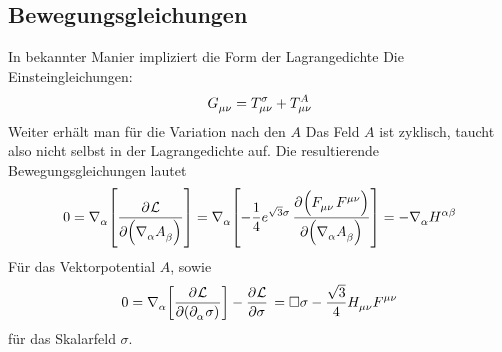 \subsection{Bewegungsgleichungen}
In bekannter Manier impliziert die Form der Lagrangedichte 
Die Einsteingleichungen:
\begin{equation}
\tensor{G}{_\mu_\nu}=\tensor*{T}{*^{\sigma}_\mu_\nu}+\tensor*{T}{*^{A}*_\mu*_\nu}
\end{equation}
Weiter erhält man für die Variation nach den $A$ 
Das Feld $A$ ist zyklisch, taucht also nicht selbst in der Lagrangedichte auf.
Die resultierende Bewegungsgleichungen lautet
\begin{equation}
0=\tensor{\nabla}{_\alpha}
\left[\dpd{\mathcal{L}}{\left(\tensor{\nabla}{_\alpha}\tensor{A}{_\beta}\right)}\right]
=\tensor{\nabla}{_\alpha}\left[-\frac{1}{4}e^{\sqrt{3}\sigma}\dpd{\left(\tensor{F}{_\mu_\nu}\tensor{F}{^\mu^\nu}\right)}{\left(\tensor{\nabla}{_\alpha}\tensor{A}{_\beta}\right)}\right]
=-\tensor{\nabla}{_\alpha}\tensor{H}{^\alpha^\beta}
 \end{equation}
 Für das Vektorpotential $A$, sowie
 \begin{equation}
0=\tensor{\nabla}{_\alpha}\left[\dpd{\mathcal{L}}{\left(\tensor{\partial}{_\alpha}\sigma\right)}\right]
-\dpd{\mathcal{L}}{\sigma}\\
=\square \sigma
-\frac{\sqrt{3}}{4}\tensor*{H}{_\mu_\nu}\tensor*{F}{^\mu^\nu}
\label{eq:dymdilat}
 \end{equation}
 für das Skalarfeld $\sigma$. 
